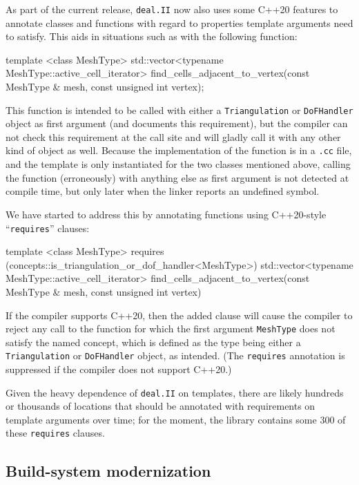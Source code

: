 \documentclass{ansarticle-preprint}
\newcommand{\specialword}[1]{\texttt{#1}}
\newcommand{\dealii}{{\specialword{deal.II}}\xspace}
\begin{document}
As part of the current release, \dealii{} now also uses some C++20
features to annotate classes and functions with regard to properties
template arguments need to satisfy. This aids in situations such as
with the
following function:
\begin{c++}
  template <class MeshType>
  std::vector<typename MeshType::active_cell_iterator>
  find_cells_adjacent_to_vertex(const MeshType &   mesh,
                                const unsigned int vertex);
\end{c++}
This function is intended to be called with either a
\texttt{Triangulation} or \texttt{DoFHandler} object as first
argument (and documents this requirement), but the compiler can not check this requirement at the call
site and will gladly call it with any other kind of object as
well. Because the implementation of the function is in a \texttt{.cc}
file, and the template is only instantiated for the two classes
mentioned above, calling the function (erroneously) with anything else
as first argument is not detected at compile time, but only later when
the linker reports an undefined symbol.

We have started to address this by annotating functions using
C++20-style ``\texttt{requires}'' clauses:
\begin{c++}
  template <class MeshType>
    requires (concepts::is_triangulation_or_dof_handler<MeshType>)
  std::vector<typename MeshType::active_cell_iterator>
  find_cells_adjacent_to_vertex(const MeshType &   mesh,
                                const unsigned int vertex)
\end{c++}
If the compiler supports C++20, then the added clause will cause the
compiler to reject any call to the function for which the first
argument \texttt{MeshType} does not satisfy the named concept, which
is defined as the type being either a \texttt{Triangulation} or \texttt{DoFHandler}
object, as intended. (The \texttt{requires} annotation is suppressed if the compiler
does not support C++20.)

Given the heavy dependence of \dealii{} on templates, there are likely
hundreds or thousands of locations that should be annotated with
requirements on template arguments over time; for the moment, the
library contains some 300 of these \texttt{requires} clauses.


\subsection{Build-system modernization}\label{sec:buildsystem}
\end{document}
